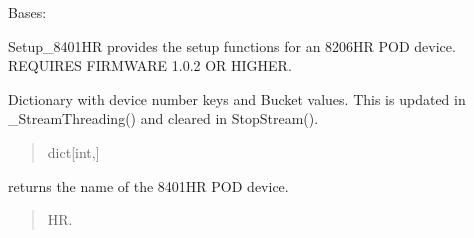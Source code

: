 \documentclass[letterpaper,10pt,english]{sphinxmanual}
\begin{document}
\begin{fulllineitems}
\label{\detokenize{Setup.SetupOneDevice:Setup.SetupOneDevice.Setup_8401HR.Setup8401HR}}
\pysigstartsignatures
{}
\pysigstopsignatures
\sphinxAtStartPar
Bases: {\hyperref[\detokenize{Setup.SetupOneDevice:Setup.SetupOneDevice.Setup_PodInterface.SetupInterface}]{}}

\sphinxAtStartPar
Setup\_8401HR provides the setup functions for an 8206\sphinxhyphen{}HR POD device.     REQUIRES FIRMWARE 1.0.2 OR HIGHER.

\begin{fulllineitems}
\label{\detokenize{Setup.SetupOneDevice:Setup.SetupOneDevice.Setup_8401HR.Setup8401HR._bucketAccess}}
\pysigstartsignatures
{}
\pysigstopsignatures
\sphinxAtStartPar
Dictionary with device number keys and Bucket values.             This is updated in \_StreamThreading() and cleared in StopStream().
\begin{quote}\begin{description}
\sphinxAtStartPar
dict{[}int,{\hyperref[\detokenize{Morelia.Stream.Collect:Morelia.Stream.Collect.DataBucket.Bucket}]{}}{]}

\end{description}\end{quote}

\end{fulllineitems}


\begin{fulllineitems}
\label{\detokenize{Setup.SetupOneDevice:Setup.SetupOneDevice.Setup_8401HR.Setup8401HR.GetDeviceName}}
\pysigstartsignatures
{}
\pysigstopsignatures
\sphinxAtStartPar
returns the name of the 8401\sphinxhyphen{}HR POD device.
\begin{quote}\begin{description}
\sphinxhyphen{}HR.


\end{description}
\end{quote}
\end{fulllineitems}
\end{fulllineitems}
\end{document}
